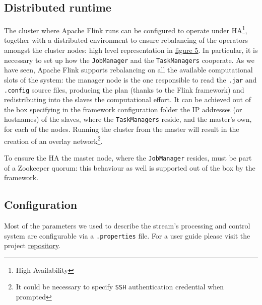 \subsection{Distributed runtime}
The cluster where Apache Flink runs can be configured to operate under HA\footnote{High Availability}, together with a distributed environment to ensure rebalancing of the operators amongst the cluster nodes: high level representation in \hyperref[fig:ember_ha]{figure 5}. 
In particular, it is necessary to set up how the \texttt{JobManager} and the \texttt{TaskManagers} cooperate. As we have seen, Apache Flink supports rebalancing on all the available computational slots of the system: the manager node is the one responsible to read the \texttt{.jar} and \texttt{.config} source files, producing the plan (thanks to the Flink framework) and redistributing into the slaves the computational effort. It can be achieved out of the box specifying in the framework configuration folder the IP addresses (or hostnames) of the slaves, where the \texttt{TaskManagers} reside, and the master's own, for each of the nodes. Running the cluster from the master will result in the creation of an overlay network\footnote{It could be necessary to specify \texttt{SSH} authentication credential when prompted}.

To ensure the HA the master node, where the \texttt{JobManager} resides, must be part of a Zookeeper quorum: this behaviour as well is supported out of the box by the framework.

\subsection{Configuration}
Most of the parameters we used to describe the stream's processing and control system are configurable via a \texttt{.properties} file. For a user guide please visit the project \href{https://github.com/projectember/project-ember}{repository}.

